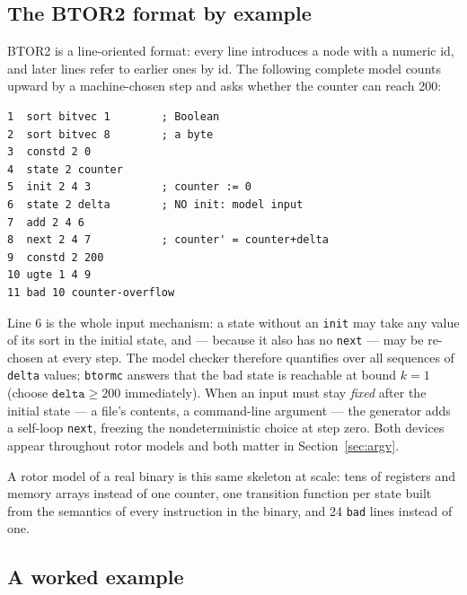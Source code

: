 \documentclass[sigplan,screen,nonacm]{acmart}
\begin{document}
\subsection{The BTOR2 format by example}
\label{sec:btor2}

BTOR2 is a line-oriented format: every line introduces a node with a
numeric id, and later lines refer to earlier ones by id. The following
complete model counts upward by a machine-chosen step and asks whether
the counter can reach 200:

\begin{lstlisting}
1  sort bitvec 1        ; Boolean
2  sort bitvec 8        ; a byte
3  constd 2 0
4  state 2 counter
5  init 2 4 3           ; counter := 0
6  state 2 delta        ; NO init: model input
7  add 2 4 6
8  next 2 4 7           ; counter' = counter+delta
9  constd 2 200
10 ugte 1 4 9
11 bad 10 counter-overflow
\end{lstlisting}

\noindent Line 6 is the whole input mechanism: a state without an
\texttt{init} may take any value of its sort in the initial state, and
--- because it also has no \texttt{next} --- may be re-chosen at every
step. The model checker therefore quantifies over all sequences of
\texttt{delta} values; \texttt{btormc} answers that the bad state is
reachable at bound $k{=}1$ (choose $\texttt{delta} \geq 200$
immediately). When an input must stay \emph{fixed} after the initial
state --- a file's contents, a command-line argument --- the generator
adds a self-loop \texttt{next}, freezing the nondeterministic choice at
step zero. Both devices appear throughout rotor models and both matter
in Section~\ref{sec:argv}.

A rotor model of a real binary is this same skeleton at scale: tens of
registers and memory arrays instead of one counter, one transition
function per state built from the semantics of every instruction in the
binary, and 24 \texttt{bad} lines instead of one.

\subsection{A worked example}
\label{sec:worked}
\end{document}

